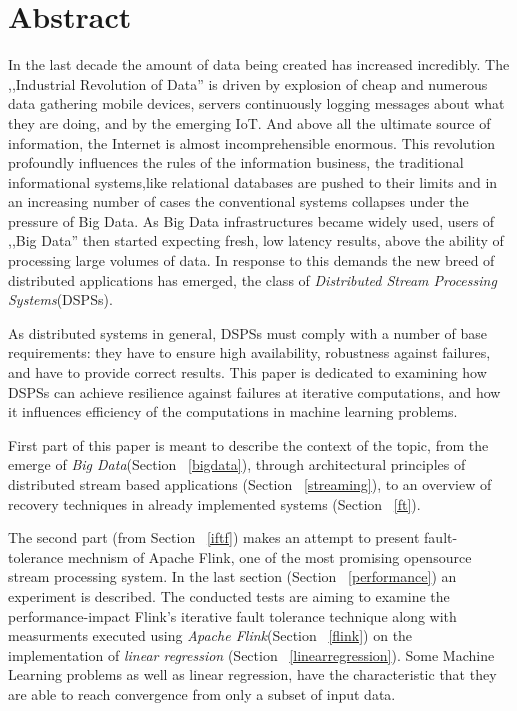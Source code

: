 



\section{Abstract}
In the last decade the amount of data being created has increased incredibly.  
The ,,Industrial Revolution of Data''\cite{aobd} is driven by explosion of cheap and numerous data gathering mobile devices, servers continuously 
logging messages about what they are doing, and by the emerging IoT. And above all the ultimate source of information, the Internet is almost incomprehensible enormous.
This revolution profoundly influences the rules of the information business, the traditional informational systems,like relational databases are pushed to their limits and in an increasing number of cases the conventional systems collapses under the pressure of Big Data.\cite{marz}
As Big Data infrastructures became widely used, users of ,,Big Data'' then started expecting fresh, low latency results, above the ability  of processing large volumes of data. In response to this demands the new breed of distributed applications has emerged, the  class of \textit{Distributed  Stream  Processing Systems}(DSPSs).

As distributed systems in general, DSPSs must comply with a number of base requirements: they have to ensure high availability, robustness against failures, and have to provide correct results.  
This paper is dedicated to examining how DSPSs can achieve resilience against failures at iterative computations, and how it influences efficiency of the computations in machine learning problems.

First part of this paper is meant to describe the context of the topic, from the emerge of \textit{Big Data}(Section ~\ref{bigdata}), through architectural principles of distributed stream based applications (Section ~\ref{streaming}), to an overview of recovery techniques in already implemented systems (Section ~\ref{ft}). 

The second part (from Section ~\ref{iftf}) makes an attempt to present fault-tolerance mechnism of Apache Flink, one of the most promising opensource stream processing system. In the last section (Section ~\ref{performance}) an experiment is  described. The conducted tests are aiming to examine the performance-impact Flink's iterative fault tolerance technique along with measurments executed using \textit{Apache Flink}(Section ~\ref{flink}) on the implementation of \textit{linear regression} (Section ~\ref{linearregression}). Some  Machine Learning problems as well as linear regression, have the characteristic that they are able to reach convergence from only a subset of input data.  
     

